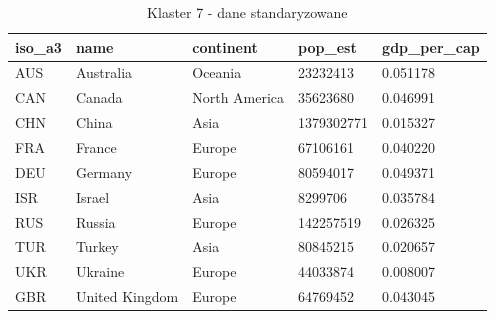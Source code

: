 \documentclass[11pt]{report}
\begin{document}
    \begin{table}[h!]
        \caption {Klaster 7 - dane standaryzowane} \label{tab:cl7std}
        \begin{tabular}{lllll}
            \hline
            \multicolumn{1}{|l|}{iso\_a3} & \multicolumn{1}{l|}{name} & \multicolumn{1}{l|}{continent} & \multicolumn{1}{l|}{pop\_est} & \multicolumn{1}{l|}{gdp\_per\_cap} \\ \hline
            AUS                           & Australia                 & Oceania                        & 23232413                      & 0.051178                           \\
            CAN                           & Canada                    & North America                  & 35623680                      & 0.046991                           \\
            CHN                           & China                     & Asia                           & 1379302771                    & 0.015327                           \\
            FRA                           & France                    & Europe                         & 67106161                      & 0.040220                           \\
            DEU                           & Germany                   & Europe                         & 80594017                      & 0.049371                           \\
            ISR                           & Israel                    & Asia                           & 8299706                       & 0.035784                           \\
            RUS                           & Russia                    & Europe                         & 142257519                     & 0.026325                           \\
            TUR                           & Turkey                    & Asia                           & 80845215                      & 0.020657                           \\
            UKR                           & Ukraine                   & Europe                         & 44033874                      & 0.008007                           \\
            GBR                           & United Kingdom            & Europe                         & 64769452                      & 0.043045
        \end{tabular}
    \end{table}
\end{document}
